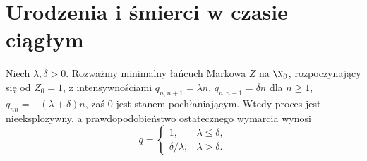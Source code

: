 \section{Urodzenia i śmierci w czasie ciągłym}
\begin{twierdzenie}
Niech $\lambda,\delta>0$. Rozważmy minimalny łańcuch Markowa
$Z$ na $\N_0$, rozpoczynający się od $Z_0=1$, z intensywnościami
$q_{n,n+1}=\lambda n$, $q_{n,n-1}=\delta n$ dla $n\ge1$,
$q_{nn}=-(\lambda+\delta)n$, zaś $0$ jest stanem pochłaniającym.
Wtedy proces jest nieeksplozywny, a prawdopodobieństwo
ostatecznego wymarcia wynosi
\[
q=\begin{cases}1,&\lambda\le\delta,\\
\delta/\lambda,&\lambda>\delta.
\end{cases}
\]
\end{twierdzenie}
